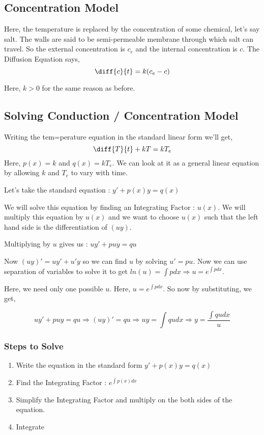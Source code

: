 \subsection{Concentration Model}

Here, the temperature is replaced by the concentration of some chemical, let's say salt.
The walls are said to be semi-permeable membrane through which salt can travel.
So the external concentration is $c_e$ and the internal concentration is $c$.
The Diffusion Equation says, 
$$ \diff{c}{t} = k(c_e - c) $$

Here, $k > 0$ for the same reason as before.

\subsection{Solving Conduction / Concentration Model}

Writing the tem=perature equation in the standard linear form we'll get, 
$$ \diff{T}{t} + kT = kT_e $$
Here, $p(x) = k$ and $q(x) = kT_e $.
We can look at it as a general linear equation by allowing $k$ and $T_e$ to vary with time.

Let's take the standard equation : $ y' + p(x) y = q(x) $

We will solve this equation by finding an Integrating Factor : $u(x)$.
We will multiply this equation by $u(x)$ and we want to choose $u(x)$ such that the left hand side is the differentiation of $(uy)$.

Multiplying by $u$ gives us : $uy' + puy = qu$

Now $(uy)' = uy' + u'y$ so we can find $u$ by solving $u' = pu$.
Now we can use separation of variables to solve it to get $ln(u) = \int p dx \Rightarrow u = e^{\int p dx}$.

Here, we need only one possible $u$. 
Here, $u = e^{\int p dx}$.
So now by substituting, we get,

$$
    uy' + puy = qu \Rightarrow
    (uy)' = qu \Rightarrow
    uy = \int qu dx \Rightarrow
    y = \frac{\int qu dx}{u}
$$

\subsubsection{Steps to Solve}

\begin{enumerate}
    \item Write the equation in the standard form $y' + p(x)y = q(x)$
    \item Find the Integrating Factor : $e^{\int p(x) dx}$
    \item Simplify the Integrating Factor and multiply on the both sides of the equation.
    \item Integrate
\end{enumerate}

